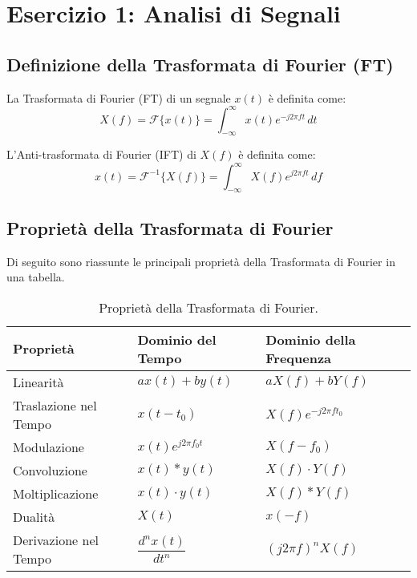 \chapter{Esercizio 1: Analisi di Segnali}

\section{Definizione della Trasformata di Fourier (FT)}

La Trasformata di Fourier (FT) di un segnale $x(t)$ è definita come:
\begin{equation*}
    X(f) = \mathcal{F}\{x(t)\} = \int_{-\infty}^{\infty} x(t) e^{-j2\pi f t} \,dt
\end{equation*}

L'Anti-trasformata di Fourier (IFT) di $X(f)$ è definita come:
\begin{equation*}
    x(t) = \mathcal{F}^{-1}\{X(f)\} = \int_{-\infty}^{\infty} X(f) e^{j2\pi f t} \,df
\end{equation*}

\section{Proprietà della Trasformata di Fourier}
Di seguito sono riassunte le principali proprietà della Trasformata di Fourier in una tabella.

\begin{table}[h!]
\centering
\caption{Proprietà della Trasformata di Fourier.}
\label{tab:ft_properties}
\begin{tabular}{lll}
    \toprule
    \textbf{Proprietà} & \textbf{Dominio del Tempo} & \textbf{Dominio della Frequenza} \\
    \midrule
    Linearità & $a x(t) + b y(t)$ & $a X(f) + b Y(f)$ \\
    \addlinespace
    Traslazione nel Tempo & $x(t - t_0)$ & $X(f) e^{-j2\pi f t_0}$ \\
    \addlinespace
    Modulazione & $x(t) e^{j2\pi f_0 t}$ & $X(f - f_0)$ \\
    \addlinespace
    Convoluzione & $x(t) * y(t)$ & $X(f) \cdot Y(f)$ \\
    \addlinespace
    Moltiplicazione & $x(t) \cdot y(t)$ & $X(f) * Y(f)$ \\
    \addlinespace
    Dualità & $X(t)$ & $x(-f)$ \\
    \addlinespace
    Derivazione nel Tempo & $\dfrac{d^n x(t)}{dt^n}$ & $(j2\pi f)^n X(f)$ \\
    \bottomrule
\end{tabular}
\end{table}


